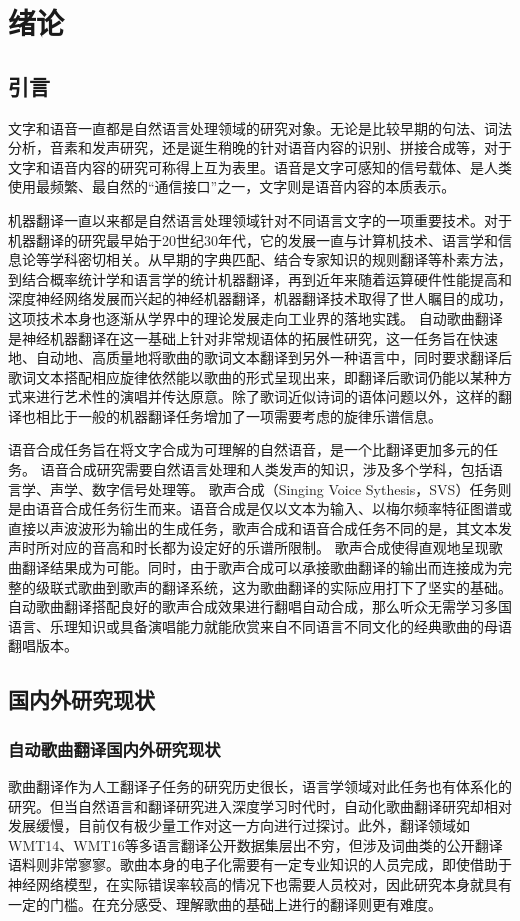 \chapter{绪论}
\section{引言}
文字和语音一直都是自然语言处理领域的研究对象。无论是比较早期的句法、词法分析，音素和发声研究，还是诞生稍晚的针对语音内容的识别、拼接合成等，对于文字和语音内容的研究可称得上互为表里。语音是文字可感知的信号载体、是人类使用最频繁、最自然的``通信接口''之一，文字则是语音内容的本质表示。

机器翻译一直以来都是自然语言处理领域针对不同语言文字的一项重要技术。对于机器翻译的研究最早始于20世纪30年代，它的发展一直与计算机技术、语言学和信息论等学科密切相关。从早期的字典匹配、结合专家知识的规则翻译等朴素方法，到结合概率统计学和语言学的统计机器翻译，再到近年来随着运算硬件性能提高和深度神经网络发展而兴起的神经机器翻译，机器翻译技术取得了世人瞩目的成功，这项技术本身也逐渐从学界中的理论发展走向工业界的落地实践。
自动歌曲翻译是神经机器翻译在这一基础上针对非常规语体的拓展性研究，这一任务旨在快速地、自动地、高质量地将歌曲的歌词文本翻译到另外一种语言中，同时要求翻译后歌词文本搭配相应旋律依然能以歌曲的形式呈现出来，即翻译后歌词仍能以某种方式来进行艺术性的演唱并传达原意。除了歌词近似诗词的语体问题以外，这样的翻译也相比于一般的机器翻译任务增加了一项需要考虑的旋律乐谱信息。

语音合成任务旨在将文字合成为可理解的自然语音，是一个比翻译更加多元的任务。
语音合成研究需要自然语言处理和人类发声的知识，涉及多个学科，包括语言学、声学、数字信号处理等。
歌声合成（Singing Voice Sythesis，SVS）任务则是由语音合成任务衍生而来。语音合成是仅以文本为输入、以梅尔频率特征图谱或直接以声波波形为输出的生成任务，歌声合成和语音合成任务不同的是，其文本发声时所对应的音高和时长都为设定好的乐谱所限制。
歌声合成使得直观地呈现歌曲翻译结果成为可能。同时，由于歌声合成可以承接歌曲翻译的输出而连接成为完整的级联式歌曲到歌声的翻译系统，这为歌曲翻译的实际应用打下了坚实的基础。自动歌曲翻译搭配良好的歌声合成效果进行翻唱自动合成，那么听众无需学习多国语言、乐理知识或具备演唱能力就能欣赏来自不同语言不同文化的经典歌曲的母语翻唱版本。
\section{国内外研究现状}
\subsection{自动歌曲翻译国内外研究现状}
歌曲翻译作为人工翻译子任务的研究历史很长，语言学领域对此任务也有体系化的研究。但当自然语言和翻译研究进入深度学习时代时，自动化歌曲翻译研究却相对发展缓慢，目前仅有极少量工作\citep{gagast}对这一方向进行过探讨。此外，翻译领域如WMT14、WMT16等多语言翻译公开数据集层出不穷，但涉及词曲类的公开翻译语料则非常寥寥。歌曲本身的电子化需要有一定专业知识的人员完成，即使借助于神经网络模型，在实际错误率较高的情况下也需要人员校对，因此研究本身就具有一定的门槛。在充分感受、理解歌曲的基础上进行的翻译则更有难度。
